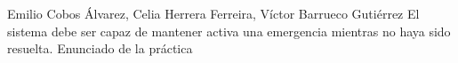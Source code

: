 {Emilio Cobos Álvarez, Celia Herrera Ferreira, Víctor Barrueco Gutiérrez}
{El sistema debe ser capaz de mantener activa una emergencia mientras no haya sido resuelta.}
{Enunciado de la práctica}

